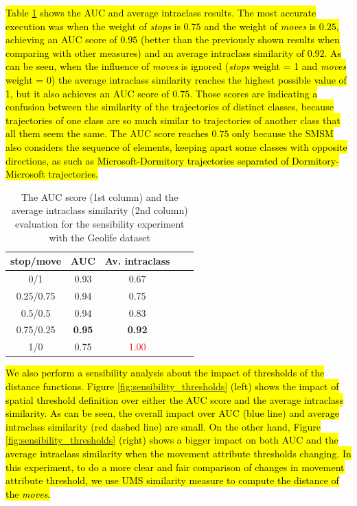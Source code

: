 \documentclass[12pt]{article}
\begin{document}
\hl{Table {\ref{tab:sensibility_stopmove}} shows the AUC and average intraclass results. The most accurate execution was when the weight of \emph{stops} is $0.75$ and the weight of \emph{moves} is $0.25$, achieving an AUC score of $0.95$ (better than the previously shown results when comparing with other measures) and an average intraclass similarity of $0.92$. As can be seen, when the influence of \emph{moves} is ignored (\emph{stops} weight = 1 and \emph{moves} weight = 0) the average intraclass similarity reaches the highest possible value of 1, but it also achieves an AUC score of $0.75$. Those scores are indicating a confusion between the similarity of the trajectories of distinct classes, because trajectories of one class are so much similar to trajectories of another class that all them seem the same. The AUC score reaches $0.75$ only because the SMSM also considers the sequence of elements, keeping apart some classes with opposite directions, as such as Microsoft-Dormitory trajectories separated of Dormitory-Microsoft trajectories.}

\begin{table}[ht!]
  \scriptsize
  \centering
  \begin{tabular}{|c|c|c|c|c|}
  	\hline
stop/move & AUC & Av. intraclass\\
  	\hline
0/1 &0.93 & 0.67\\
0.25/0.75 & 0.94 & 0.75\\
0.5/0.5 & 0.94 & 0.83\\
0.75/0.25 & \textbf{0.95} & \textbf{0.92}\\
1/0 & 0.75 & \textcolor{red}{1.00} \\
    \hline
  \end{tabular}
  \caption{The AUC score (1st column) and the average intraclass similarity (2nd column) evaluation for the sensibility experiment with the Geolife dataset}
  \label{tab:sensibility_stopmove}
\end{table}

\hl{We also perform a sensibility analysis about the impact of thresholds of the distance functions. Figure {\ref{fig:sensibility_thresholds}} (left) shows the impact of spatial threshold definition over either the AUC score and the average intraclass similarity. As can be seen, the overall impact over AUC (blue line) and average intraclass similarity (red dashed line) are small. On the other hand, Figure {\ref{fig:sensibility_thresholds}} (right) shows a bigger impact on both AUC and the average intraclass similarity when the movement attribute thresholds changing. In this experiment, to do a more clear and fair comparison of changes in movement attribute threshold, we use UMS similarity measure to compute the distance of the \emph{moves}.}
\end{document}
